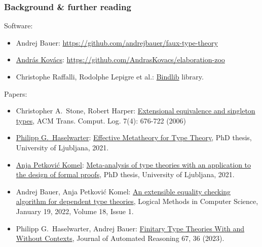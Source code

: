 \documentclass[11pt,aspectratio=169]{beamer}
\begin{document}
\begin{frame}
  \frametitle{Background \& further reading}

  \footnotesize

  Software:
  \begin{itemize}
  \item Andrej Bauer: \url{https://github.com/andrejbauer/faux-type-theory}
  \item \href{https://andraskovacs.github.io}{András Kovács}: \url{https://github.com/AndrasKovacs/elaboration-zoo}
  \item Christophe Raffalli, Rodolphe Lepigre et al.: \href{https://ocaml.org/p/bindlib/6.0.0}{Bindlib} library.
  \end{itemize}
  Papers:
  \begin{itemize}
  \item Christopher A.~Stone, Robert Harper: \href{https://doi.org/10.1145/1183278.1183281}{Extensional equivalence and
      singleton types}, ACM Trans. Comput. Log. 7(4): 676-722 (2006)
  \item \href{https://haselwarter.org}{Philipp G.~Haselwarter}: \href{https://haselwarter.org/assets/pdfs/effective-metatheory-for-type-theory.pdf}{Effective Metatheory for Type
      Theory}, PhD thesis, University of Ljubljana, 2021.
  \item \href{https://anjapetkovic.com}{Anja Petković Komel}: \href{https://anjapetkovic.com/\#phd}{Meta-analysis of type theories with an application to the design of formal proofs}, PhD thesis, University of Ljubljana, 2021.
  \item Andrej Bauer, Anja Petković Komel: \href{https://doi.org/10.46298/lmcs-18\%281\%3A17\%292022}{An extensible equality checking algorithm for dependent type theories}, Logical Methods in Computer Science, January 19, 2022, Volume 18, Issue 1.
  \item Philipp G.~Haselwarter, Andrej Bauer: \href{https://doi.org/10.1007/s10817-023-09678-y}{Finitary Type Theories With and Without Contexts}, Journal of Automated Reasoning 67, 36 (2023).
  \end{itemize}
\end{frame}
\end{document}
